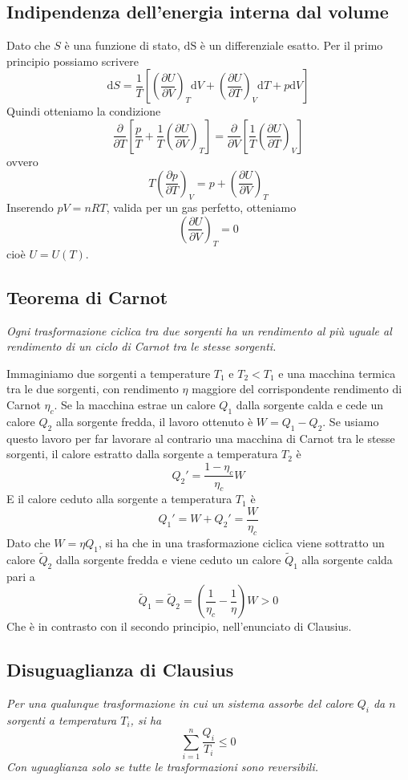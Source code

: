 \documentclass[a4paper,11pt]{article}
\begin{document}
\subsection{Indipendenza dell'energia interna dal volume \label{energia}}
Dato che $S$ è una funzione di stato, $\mathrm{dS}$ è un differenziale esatto. Per il primo principio possiamo scrivere
\[\mathrm{d}S=\frac{1}{T}\left[\left(\frac{\partial U}{\partial V}\right)_T\mathrm{d}V+\left(\frac{\partial U}{\partial T}\right)_V\mathrm{d}T+p\mathrm{d}V\right]\]
Quindi otteniamo la condizione
\[\frac{\partial}{\partial T}\left[\frac{p}{T}+\frac{1}{T}\left(\frac{\partial U}{\partial V}\right)_T\right]=\frac{\partial}{\partial V}\left[\frac{1}{T}\left(\frac{\partial U}{\partial T}\right)_V\right]\]
ovvero 
\[T\left(\frac{\partial p}{\partial T}\right)_V=p+\left(\frac{\partial U}{\partial V}\right)_T\]
Inserendo $pV=nRT$, valida per un gas perfetto, otteniamo
\[\left(\frac{\partial U}{\partial V}\right)_T=0\]
cioè $U=U(T)$.

\subsection{Teorema di Carnot}
\textit{Ogni trasformazione ciclica tra due sorgenti ha un rendimento al più uguale al rendimento di un ciclo di Carnot tra le stesse sorgenti.}

\noindent Immaginiamo due sorgenti a temperature $T_1$ e $T_2<T_1$ e una macchina termica tra le due sorgenti, con rendimento $\eta$ maggiore del corrispondente rendimento di Carnot $\eta_c$. Se la macchina estrae un calore $Q_1$ dalla sorgente calda e cede un calore $Q_2$ alla sorgente fredda, il lavoro ottenuto è $W=Q_1-Q_2$. Se usiamo questo lavoro per far lavorare al contrario una macchina di Carnot tra le stesse sorgenti, il calore estratto dalla sorgente a temperatura $T_2$ è
\[Q_2'=\frac{1-\eta_c}{\eta_c}W\]
E il calore ceduto alla sorgente a temperatura $T_1$ è
\[Q_1'=W+Q_2'=\frac{W}{\eta_c}\]
Dato che $W=\eta Q_1$, si ha che in una trasformazione ciclica viene sottratto un calore $\tilde{Q}_2$ dalla sorgente fredda e viene ceduto un calore $\tilde{Q}_1$ alla sorgente calda pari a
\[\tilde{Q}_1=\tilde{Q}_2=\left(\frac{1}{\eta_c}-\frac{1}{\eta}\right)W>0\]
Che è in contrasto con il secondo principio, nell'enunciato di Clausius.

\subsection{Disuguaglianza di Clausius}
\textit{Per una qualunque trasformazione in cui un sistema assorbe del calore $Q_i$ da $n$ sorgenti a temperatura $T_i$, si ha
\[\sum_{i=1}^{n}\frac{Q_i}{T_i}\leq 0\]
Con uguaglianza solo se tutte le trasformazioni sono reversibili.}
\end{document}
